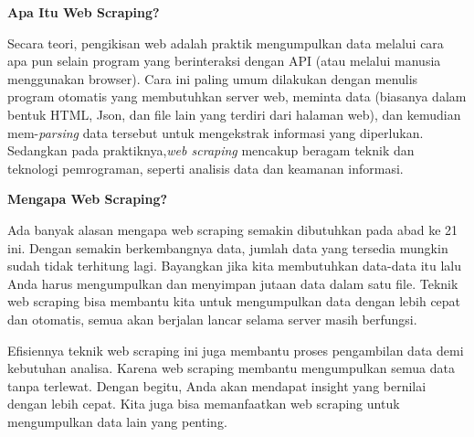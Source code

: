 
\par \textbf{Apa Itu Web Scraping?}
\par Secara teori, pengikisan web adalah praktik mengumpulkan data melalui cara apa pun selain program yang berinteraksi dengan API (atau melalui manusia menggunakan browser). Cara ini paling umum dilakukan dengan menulis program otomatis yang membutuhkan server web, meminta data (biasanya dalam bentuk HTML, Json, dan file lain yang terdiri dari halaman web), dan kemudian mem-\textit{parsing} data tersebut untuk mengekstrak informasi yang diperlukan. Sedangkan pada praktiknya,\textit{web scraping} mencakup beragam teknik dan teknologi pemrograman, seperti analisis data dan keamanan informasi.

\textbf{Mengapa Web Scraping?}
\par Ada banyak alasan mengapa web scraping semakin dibutuhkan pada abad ke 21 ini. Dengan semakin berkembangnya data, jumlah data yang tersedia mungkin sudah tidak terhitung lagi. Bayangkan jika kita membutuhkan data-data itu lalu Anda harus mengumpulkan dan menyimpan jutaan data dalam satu file. Teknik web scraping bisa membantu kita untuk mengumpulkan data dengan lebih cepat dan otomatis, semua akan berjalan lancar selama server masih berfungsi.

Efisiennya teknik web scraping ini juga membantu proses pengambilan data demi kebutuhan analisa. Karena web scraping membantu mengumpulkan semua data tanpa terlewat. Dengan begitu, Anda akan mendapat insight yang bernilai dengan lebih cepat. Kita juga bisa memanfaatkan web scraping untuk mengumpulkan data lain yang penting.
